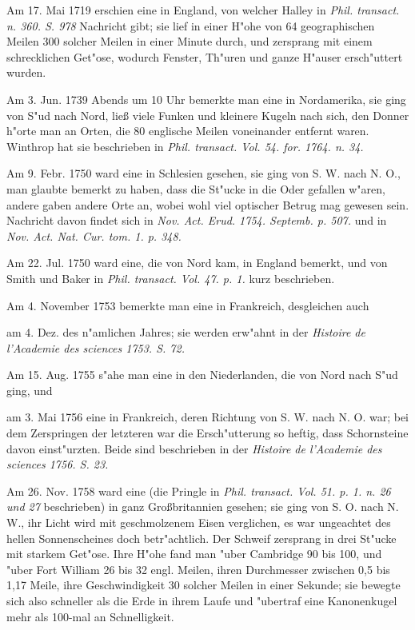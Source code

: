 \documentclass[a4paper, 11pt, oneside, polutonikogreek, german]{article}
\begin{document}
Am 17. Mai 1719 erschien eine in England, von welcher Halley in \emph{Phil. transact. n. 360. S. 978} Nachricht gibt; sie lief in einer H"ohe von 64 geographischen Meilen 300 solcher Meilen in einer Minute durch, und zersprang mit einem schrecklichen Get"ose, wodurch Fenster, Th"uren und ganze H"auser ersch"uttert wurden.

Am 3. Jun. 1739 Abends um 10 Uhr bemerkte man eine in Nordamerika, sie ging von S"ud nach Nord, ließ viele Funken und kleinere Kugeln nach sich, den Donner h"orte man an Orten, die 80 englische Meilen voneinander entfernt waren. Winthrop hat sie beschrieben in \emph{Phil. transact. Vol. 54. for. 1764. n. 34.}

Am 9. Febr. 1750 ward eine in Schlesien gesehen, sie ging von S. W. nach N. O., man glaubte bemerkt zu haben, dass die St"ucke in die Oder gefallen w"aren, andere gaben andere Orte an, wobei wohl viel optischer Betrug mag gewesen sein. Nachricht davon findet sich in \emph{Nov. Act. Erud. 1754. Septemb. p. 507.} und in \emph{Nov. Act. Nat. Cur. tom. 1. p. 348.}

Am 22. Jul. 1750 ward eine, die von Nord kam, in England bemerkt, und von Smith und Baker in \emph{Phil. transact. Vol. 47. p. 1.} kurz beschrieben.

Am 4. November 1753 bemerkte man eine in Frankreich, desgleichen auch

am 4. Dez. des n"amlichen Jahres; sie werden erw"ahnt in der \emph{Histoire de l'Academie des sciences 1753. S. 72.}

Am 15. Aug. 1755 s"ahe man eine in den Niederlanden, die von Nord nach S"ud ging, und

am 3. Mai 1756 eine in Frankreich, deren Richtung von S. W. nach N. O. war; bei dem Zerspringen der letzteren war die Ersch"utterung so heftig, dass Schornsteine davon einst"urzten. Beide sind beschrieben in der \emph{Histoire de l'Academie des sciences 1756. S. 23.}

Am 26. Nov. 1758 ward eine (die Pringle in \emph{Phil. transact. Vol. 51. p. 1. n. 26 und 27} beschrieben) in ganz Großbritannien gesehen; sie ging von S. O. nach N. W., ihr Licht wird mit geschmolzenem Eisen verglichen, es war ungeachtet des hellen Sonnenscheines doch betr"achtlich. Der Schweif zersprang in drei St"ucke mit starkem Get"ose. Ihre H"ohe fand man "uber Cambridge 90 bis 100, und "uber Fort William 26 bis 32 engl. Meilen, ihren Durchmesser zwischen 0,5 bis 1,17 Meile, ihre Geschwindigkeit 30 solcher Meilen in einer Sekunde; sie bewegte sich also schneller als die Erde in ihrem Laufe und "ubertraf eine Kanonenkugel mehr als 100-mal an Schnelligkeit.
\end{document}
